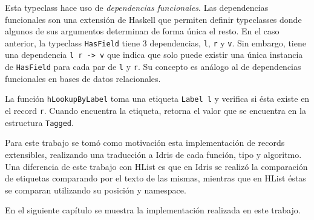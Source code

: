 Esta typeclass hace uso de \textit{dependencias funcionales}. Las dependencias funcionales son una extensión de Haskell que permiten definir typeclasses donde algunos de sus argumentos determinan de forma única el resto. En el caso anterior, la typeclass \texttt{HasField} tiene 3 dependencias, \texttt{l}, \texttt{r} y \texttt{v}. Sin embargo, tiene una dependencia \texttt{l r -> v} que indica que solo puede existir una única instancia de \texttt{HasField} para cada par de \texttt{l} y \texttt{r}. Su concepto es análogo al de dependencias funcionales en bases de datos relacionales.

La función \texttt{hLookupByLabel} toma una etiqueta \texttt{Label l} y verifica si ésta existe en el record \texttt{r}. Cuando encuentra la etiqueta, retorna el valor que se encuentra en la estructura \texttt{Tagged}.

Para este trabajo se tomó como motivación esta implementación de records extensibles, realizando una traducción a Idris de cada función, tipo y algoritmo. Una diferencia de este trabajo con HList es que en Idris se realizó la comparación de etiquetas comparando por el texto de las mismas, mientras que en HList éstas se comparan utilizando su posición y namespace.

En el siguiente capítulo se muestra la implementación realizada en este trabajo.
